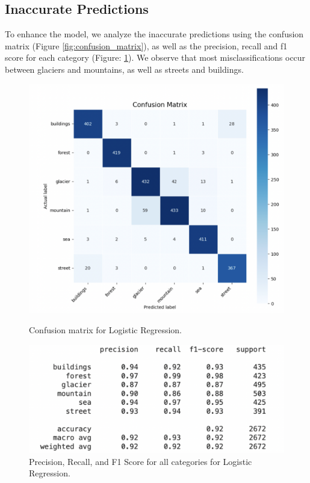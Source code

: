 \documentclass[11pt]{article}
\begin{document}
\subsection{Inaccurate Predictions}
To enhance the model, we analyze the inaccurate predictions using the confusion matrix (Figure \ref{fig:confusion_matrix}), as well as the precision, recall and f1 score for each category (Figure: \ref{fig:classification}). We observe that most misclassifications occur between glaciers and mountains, as well as streets and buildings. 

\begin{figure}[h!]
    \centering
    \begin{minipage}[b]{0.48\textwidth}
        \centering
        \includegraphics[width=\textwidth]{confusion_matrix.png}
        \caption{Confusion matrix for Logistic Regression.}
        \label{fig:confusion_matrix}
    \end{minipage}\hfill
    \begin{minipage}[b]{0.48\textwidth}
        \centering
        \includegraphics[width=\textwidth]{classification.png}
        \caption{Precision, Recall, and F1 Score for all categories for Logistic Regression.}
        \label{fig:classification}
    \end{minipage}
\end{figure}
\end{document}
